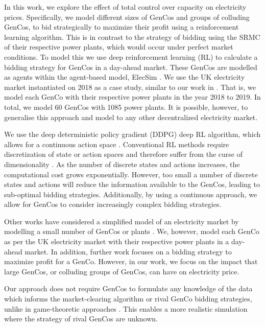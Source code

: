 In this work, we explore the effect of total control over capacity on electricity prices. Specifically, we model different sizes of GenCos and groups of colluding GenCos, to bid strategically to maximize their profit using a reinforcement learning algorithm. This is in contrast to the strategy of bidding using the SRMC of their respective power plants, which would occur under perfect market conditions. To model this we use deep reinforcement learning (RL) to calculate a bidding strategy for GenCos in a day-ahead market. These GenCos are modelled as agents within the agent-based model, ElecSim \cite{Kell, Kell2020}. We use the UK electricity market instantiated on 2018 as a case study, similar to our work in \cite{Kell2019a}. That is, we model each GenCo with their respective power plants in the year 2018 to 2019. In total, we model 60 GenCos with 1085 power plants. It is possible, however, to generalise this approach and model to any other decentralized electricity market. 

We use the deep deterministic policy gradient (DDPG) deep RL algorithm, which allows for a continuous action space \cite{Hunt2016a}. Conventional RL methods require discretization of state or action spaces and therefore suffer from the curse of dimensionality \cite{Ye2020a}. As the number of discrete states and actions increases, the computational cost grows exponentially. However, too small a number of discrete states and actions will reduce the information available to the GenCos, leading to sub-optimal bidding strategies. Additionally, by using a continuous approach, we allow for GenCos to consider increasingly complex bidding strategies. 

Other works have considered a simplified model of an electricity market by modelling a small number of GenCos or plants \cite{EsmaeiliAliabadi2017,Tellidou2007}. We, however, model each GenCo as per the UK electricity market with their respective power plants in a day-ahead market. In addition, further work focuses on a bidding strategy to maximize profit for a GenCo. However, in our work, we focus on the impact that large GenCos, or colluding groups of GenCos, can have on electricity price.


Our approach does not require GenCos to formulate any knowledge of the data which informs the market-clearing algorithm or rival GenCo bidding strategies, unlike in game-theoretic approaches \cite{Wang2011}. This enables a more realistic simulation where the strategy of rival GenCos are unknown.






